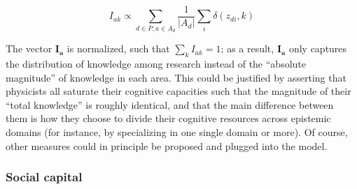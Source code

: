 \documentclass{article}
\begin{document}
\begin{equation}
    I_{ak} \propto  \sum_{d\in P,a\in A_d} \dfrac{1}{|A_d|}\sum_i \delta(z_{di},k)
\end{equation}

The vector $\bm{I_a}$ is normalized, such that $\sum_k I_{ak}=1$; as a result, $\bm{I_a}$ only captures the distribution of knowledge among research instead of the ``absolute magnitude'' of knowledge in each area. This could be justified by asserting that physicists all saturate their cognitive capacities such that the magnitude of their ``total knowledge'' is roughly identical, and that the main difference between them is how they choose to divide their cognitive resources across epistemic domains (for instance, by specializing in one single domain or more). Of course, other measures could in principle be proposed and plugged into the model. 

\subsubsection{Social capital}
\end{document}
